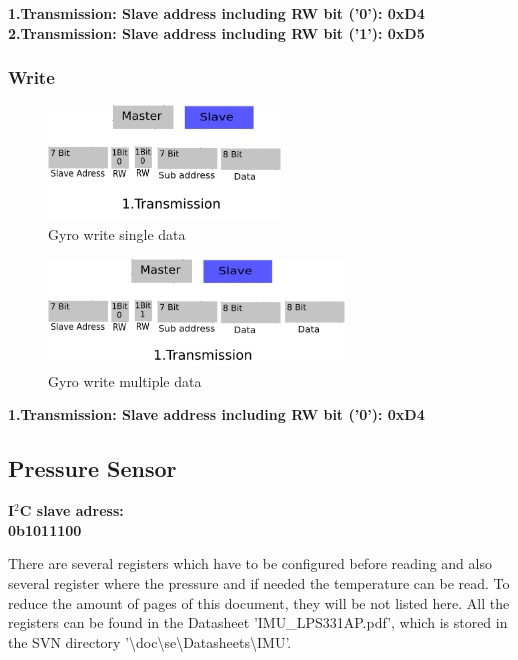 \textbf{1.Transmission: Slave address including RW bit ('0'): 0xD4}\\
\textbf{2.Transmission: Slave address including RW bit ('1'): 0xD5}

\subsubsection{Write}
\label{subsubsec:Gyrowrite}

\begin{figure}[H]
	\centering\includegraphics[width=0.55\textwidth]{fig/ACC_write_single}
	\caption{Gyro write single data}
	\label{fig:Gyro3}
\end{figure}

\begin{figure}[H]
	\centering\includegraphics[width=0.7\textwidth]{fig/ACC_write_multiple}
	\caption{Gyro write multiple data}
	\label{fig:Gyro4}
\end{figure}

\textbf{1.Transmission: Slave address including RW bit ('0'): 0xD4}

\subsection{Pressure Sensor}
\label{subsec:Pressure}

\textbf{I$^2$C slave adress:\\
0b1011100}

There are several registers which have to be configured before reading and also several register where the pressure and if needed the temperature can be read. To reduce the amount of pages of this document, they will be not listed here. All the registers can be found in the Datasheet 'IMU\_LPS331AP.pdf', which is stored in the SVN directory '\textbackslash{}doc\textbackslash{}se\textbackslash{}Datasheets\textbackslash{}IMU'.

